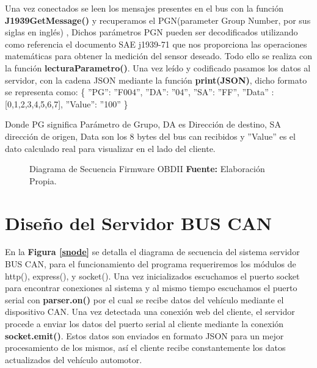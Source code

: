 Una vez conectados se leen los mensajes presentes en el bus con la función {\bfseries J1939GetMessage()} y recuperamos el PGN(parameter Group Number, por sus siglas en inglés) , 
Dichos parámetros PGN pueden ser decodificados utilizando como referencia el documento SAE j1939-71 que nos proporciona las operaciones matemáticas para obtener la medición del sensor deseado.  Todo ello se realiza con la función {\bfseries lecturaParametro()}.
Una vez leído y codificado pasamos los datos al servidor, con la cadena JSON  mediante la función {\bfseries print(JSON)}, dicho formato se representa como: 
\{
''PG'': ''F004'',
''DA'':  ''04'',
''SA'':  ''FF'',
''Data'' : [0,1,2,3,4,5,6,7],
''Value'': ''100''
\}

Donde PG significa Parámetro de Grupo, DA es Dirección de destino, SA dirección de origen, Data son los 8 bytes del bus can recibidos y ''Value'' es el dato calculado real para visualizar en el lado del cliente.






\begin{figure}[H]
	\centering
	\begin{center}
		
	\end{center}
	\caption[Diagrama de Secuencia Firmware OBDII.]{Diagrama de Secuencia Firmware OBDII \textbf{ Fuente:} Elaboración Propia.}
	\label{sj} %
\end{figure}


\section{Diseño del Servidor BUS CAN}
En la \textbf{Figura \ref{snode}} se detalla el diagrama de secuencia del sistema servidor BUS CAN, para el funcionamiento del programa requeriremos los módulos de http(), express(), y socket(). Una vez inicializados escuchamos el puerto socket para encontrar conexiones al sistema y al mismo tiempo escuchamos el puerto serial con {\bfseries parser.on()} por el cual se recibe datos del vehículo mediante el dispositivo CAN. 
Una vez detectada una conexión web del cliente,  el servidor  procede a enviar los datos del puerto serial al cliente mediante la conexión  {\bfseries socket.emit()}. Estos datos son enviados en formato JSON para un mejor procesamiento de los mismos,  así el cliente recibe constantemente los datos actualizados del vehículo automotor. 

